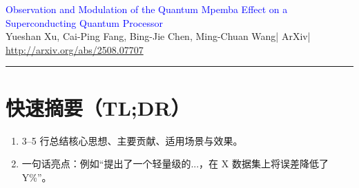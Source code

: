 \documentclass[11pt,a4paper]{article}
\newcommand{\PaperMeta}{}
\newcommand{\PaperTitle}{}
\newcommand{\PaperAuthors}{}
\newcommand{\PaperVenue}{}
\newcommand{\PaperYear}{}
\newcommand{\PaperLink}{}
\begin{document}
\renewcommand{\PaperTitle}{Observation and Modulation of the Quantum Mpemba Effect on a Superconducting Quantum Processor}
\renewcommand{\PaperAuthors}{Yueshan Xu, Cai-Ping Fang, Bing-Jie Chen, Ming-Chuan Wang}
\renewcommand{\PaperVenue}{ArXiv}
\renewcommand{\PaperYear}{2025}
\renewcommand{\PaperLink}{http://arxiv.org/abs/2508.07707}
\renewcommand{\PaperMeta}{\PaperTitle\ --- \PaperYear}

\newcommand{\paperpath}{D:/B_Dr/arXiv-2508.07707v1/}
\graphicspath{{\paperpath}}

\begin{center}
    {\LARGE \textcolor{blue}{\PaperTitle}}\\[6pt]
    {\small \PaperAuthors \quad | \quad \PaperVenue \quad | \quad \PaperYear}\\
    {\small \url{\PaperLink}}
\end{center}

\tableofcontents
\vspace{6pt}
\hrule
\vspace{10pt}

\section*{快速摘要（TL;DR）}
\begin{enumerate}[leftmargin=*]
    \item 3--5 行总结核心思想、主要贡献、适用场景与效果。
    \item 一句话亮点：例如“提出了一个轻量级的...，在 X 数据集上将误差降低了 Y\%”。
\end{enumerate}
\end{document}
